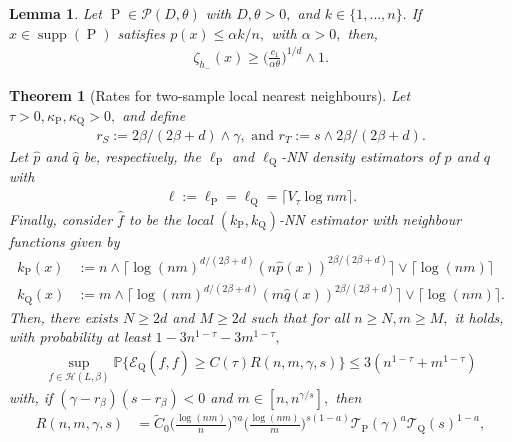 \documentclass[10pt,a4paper]{amsart}
\newtheorem{lemma}{Lemma}
\newtheorem{theorem}{Theorem}
\renewcommand{\P}{\operatorname{P}}
\newcommand{\PP}{\mathbb{P}}
\newcommand{\Q}{\operatorname{Q}}
\renewcommand{\k}{\kappa}
\newcommand{\mE}{\mathcal{E}}
\newcommand{\mH}{\mathcal{H}}
\newcommand{\mP}{\mathcal{P}}
\newcommand{\mT}{\mathcal{T}}
\newcommand{\supp}{\operatorname{supp}}
\newcommand{\wh}{\widehat}
\begin{document}
\begin{lemma}
    \label{lem.bounded.below.zeta.low.density}
    Let $\P \in \mP(D, \theta)$ with $D, \theta > 0,$ and $k \in \{1, \dots, n\}.$ If $x \in \supp(\P)$ satisfies $p(x) \leq \alpha k/n,$ with $\alpha > 0,$ then, 
    \begin{align*}
         \zeta_{h_-}(x) \geq \bigg(\frac{c_1}{\alpha \theta}\bigg)^{1/d} \wedge 1.
    \end{align*}
\end{lemma}

\begin{theorem}[Rates for two-sample local nearest neighbours]
\label{th.rates.local.k.two.sample.proof}
    Let $\tau > 0, \k_{\P}, \k_{\Q} >0,$ and define
    \begin{align*}
        r_S := 2\beta/(2\beta + d) \wedge \gamma,\text{ and }r_T := s\wedge 2\beta/(2\beta + d).
    \end{align*}
    Let $\wh p$ and $\wh q$ be, respectively, the $\ell_{\P}$ and $\ell_{\Q}$-NN density estimators of $p$ and $q$ with
    \begin{align*}
        \ell := \ell_{\P} = \ell_{\Q} = \big\lceil V_\tau\log nm\big\rceil.
    \end{align*}
    Finally, consider $\wh f$ to be the local $(k_{\P}, k_{\Q})$-NN estimator with neighbour functions given by
    \begin{align*}
        k_{\P}(x) &:= n\wedge \Big\lceil \log(nm)^{d/(2\beta + d)}(n\wh p(x))^{2\beta/(2\beta + d)}\Big\rceil \vee \big\lceil \log (nm) \big\rceil\\
        k_{\Q}(x) &:= m\wedge \Big\lceil \log(nm)^{d/(2\beta + d)}(m\wh q(x))^{2\beta/(2\beta + d)}\Big\rceil \vee \big\lceil \log (nm) \big\rceil.
    \end{align*}
    Then, there exists $N \geq 2d$ and $M \geq 2d$ such that for all $n \geq N, m \geq M,$ it holds, with probability at least $1 - 3n^{1-\tau} - 3m^{1-\tau},$
    \begin{align*}
        \sup_{f \in \mH(L, \beta)}\PP\Big\{\mE_{\Q}(\wh f, f) \geq C(\tau)R(n,m, \gamma, s)\Big\} \leq 3(n^{1 - \tau} + m^{1 - \tau})
    \end{align*}
    with, if $(\gamma - r_\beta)(s - r_\beta) <0$ and $m \in [n, n^{\gamma/s}],$ then
    \begin{align*}
        R(n,m, \gamma, s) &= \tilde C_0\Big(\frac{\log(nm)}{n}\Big)^{\gamma a}\Big(\frac{\log(nm)}{m}\Big)^{s(1- a)}\mT_{\P}(\gamma)^{a}\mT_{\Q}(s)^{1-a},
    \end{align*}

\end{theorem}
\end{document}
